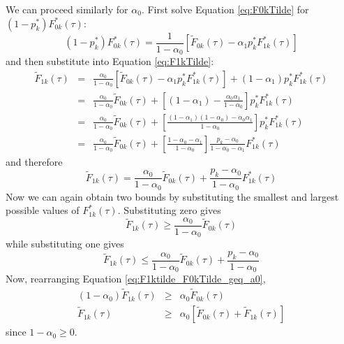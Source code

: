 \documentclass[12pt]{article}
\begin{document}
We can proceed similarly for $\alpha_0$.
First solve Equation \ref{eq:F0kTilde} for $(1 - p_k^*)F^*_{0k}(\tau)$:
\[
  (1 - p_k^*)F^*_{0k}(\tau) = \frac{1}{1 - \alpha_0}\left[ \widetilde{F}_{0k}(\tau) - \alpha_1 p_k^* F_{1k}^*(\tau)\right]
\]
and then substitute into Equation \ref{eq:F1kTilde}:
\begin{eqnarray*}
  \widetilde{F}_{1k}(\tau) &=&  \frac{\alpha_0}{1 - \alpha_0}\left[ \widetilde{F}_{0k}(\tau) - \alpha_1 p_k^* F_{1k}^*(\tau)\right] + (1 - \alpha_1) p_k^* F_{1k}^*(\tau) \\
  &=& \frac{\alpha_0}{1 - \alpha_0} \widetilde{F}_{0k}(\tau) + \left[ (1 - \alpha_1) - \frac{\alpha_0 \alpha_1}{1 - \alpha_0}   \right] p_k^* F_{1k}^*(\tau) \\
  &=& \frac{\alpha_0}{1 - \alpha_0} \widetilde{F}_{0k}(\tau) + \left[ \frac{(1 - \alpha_1)(1 - \alpha_0) - \alpha_0 \alpha_1}{1 - \alpha_0}   \right] p_k^* F_{1k}^*(\tau) \\
  &=& \frac{\alpha_0}{1 - \alpha_0} \widetilde{F}_{0k}(\tau) + \left[ \frac{1 - \alpha_0 - \alpha_1}{1 - \alpha_0}   \right] \frac{p_k - \alpha_0}{1 - \alpha_0 - \alpha_1} F_{1k}^*(\tau) 
\end{eqnarray*}
and therefore
\begin{equation}
  \widetilde{F}_{1k}(\tau) = \frac{\alpha_0}{1 - \alpha_0} \widetilde{F}_{0k}(\tau) +  \frac{p_k - \alpha_0}{1 - \alpha_0} F_{1k}^*(\tau) 
\end{equation}
Now we can again obtain two bounds by substituting the smallest and largest possible values of $F_{1k}^*(\tau)$.
Substituting zero gives
\begin{equation}
  \widetilde{F}_{1k}(\tau) \geq \frac{\alpha_0}{1 - \alpha_0} \widetilde{F}_{0k}(\tau)
  \label{eq:F1ktilde_F0kTilde_geq_a0}
\end{equation}
while substituting one gives
\begin{equation}
  \widetilde{F}_{1k}(\tau) \leq \frac{\alpha_0}{1 - \alpha_0} \widetilde{F}_{0k}(\tau) + \frac{p_k - \alpha_0}{1 - \alpha_0}
  \label{eq:F1ktilde_F0kTilde_leq_a0}
\end{equation}
Now, rearranging Equation \ref{eq:F1ktilde_F0kTilde_geq_a0}, 
\begin{eqnarray*}
  (1 - \alpha_0)\widetilde{F}_{1k}(\tau) &\geq& \alpha_0 \widetilde{F}_{0k}(\tau) \\
  \widetilde{F}_{1k}(\tau) &\geq& \alpha_0 \left[\widetilde{F}_{0k}(\tau) + \widetilde{F}_{1k}(\tau)\right] 
\end{eqnarray*}
since $1 - \alpha_0 \geq 0$.
\end{document}
